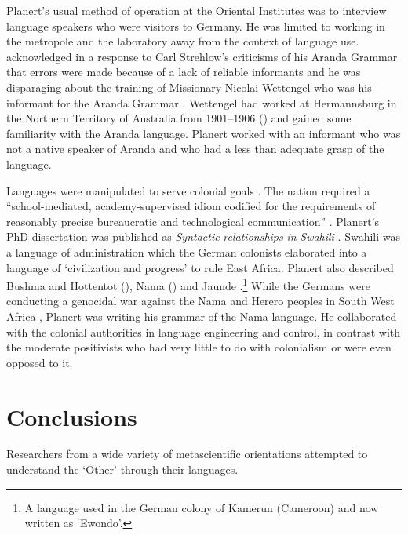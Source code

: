 \documentclass[output=paper]{../langscibook}
\begin{document}
Planert’s usual method of operation at the Oriental Institutes was to interview language speakers who were visitors to Germany. He was limited to working in the metropole and the laboratory away from the context of language use. \citet{planert_erwiderung_1908} acknowledged in a response to Carl Strehlow’s criticisms of his Aranda Grammar that errors were made because of a lack of reliable informants and he was disparaging about the training of Missionary Nicolai Wettengel who was his informant for the Aranda Grammar \citep{planert_australische_1907}.  Wettengel had worked at Hermannsburg in the Northern Territory of Australia from 1901--1906 (\citealt[1154]{strehlow_tale_2011}) and gained some familiarity with the Aranda language. Planert worked with an informant who was not a native speaker of Aranda and who had a less than adequate grasp of the language. 

Languages were manipulated to serve colonial goals \citep[88]{errington_linguistics_2008}. The nation required a “school-mediated, academy-supervised idiom codified for the requirements of reasonably precise bureaucratic and technological communication” \citep[57]{gellner_nations_1983}. Planert’s PhD dissertation was published as \textit{Syntactic} \textit{relationships} \textit{in} \textit{Swahili} \citep{planert_syntaktischen_1907}. Swahili was a language of administration which the German colonists elaborated into a language of ‘civilization and progress’ to rule East Africa. Planert also described Bushma and Hottentot (\citeyear{planert_handbuch_1905}), Nama (\citeyear{planert_handbuch_1905}) and Jaunde \citep{nekes_lehrbuch_1911}.\footnote{A language used in the German colony of Kamerun (Cameroon) and now written as ‘Ewondo’.} While the Germans were conducting a genocidal war against the Nama and Herero peoples in South West Africa \citep{hull_military_2005}, Planert was writing his grammar of the Nama language. He collaborated with the colonial authorities in language engineering and control, in contrast with the moderate positivists who had very little to do with colonialism or were even opposed to it. 

\section{Conclusions} 

Researchers from a wide variety of metascientific orientations attempted to understand the ‘Other’ through their languages. 
\end{document}
